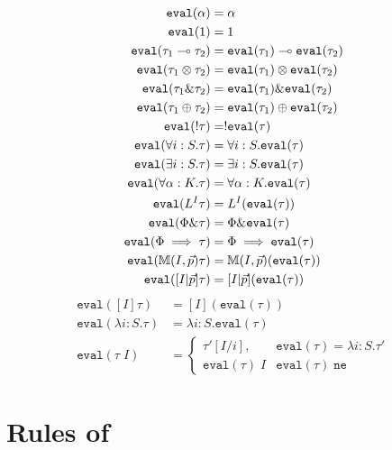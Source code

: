 \begin{align*}
\texttt{eval}(\alpha) &= \alpha\\
\texttt{eval}(1) &= 1\\
\texttt{eval}(\tau_1 \multimap \tau_2) &= \texttt{eval}(\tau_1) \multimap \texttt{eval}(\tau_2)\\
\texttt{eval}(\tau_1 \otimes \tau_2) &= \texttt{eval}(\tau_1) \otimes \texttt{eval}(\tau_2)\\
\texttt{eval}(\tau_1 \& \tau_2) &= \texttt{eval}(\tau_1) \& \texttt{eval}(\tau_2)\\
\texttt{eval}(\tau_1 \oplus \tau_2) &= \texttt{eval}(\tau_1) \oplus \texttt{eval}(\tau_2)\\
\texttt{eval}(!\tau) &= !\texttt{eval}(\tau)\\
\texttt{eval}(\forall i : S. \tau) &= \forall i : S. \texttt{eval}(\tau)\\
\texttt{eval}(\exists i : S. \tau) &= \exists i : S. \texttt{eval}(\tau)\\
\texttt{eval}(\forall \alpha : K. \tau) &= \forall \alpha : K. \texttt{eval}(\tau)\\
\texttt{eval}(L^I\tau) &= L^I(\texttt{eval}(\tau))\\
\texttt{eval}(\Phi \& \tau) &= \Phi \& \texttt{eval}(\tau)\\
\texttt{eval}(\Phi \implies \tau) &= \Phi \implies \texttt{eval}(\tau)\\
\texttt{eval}(\mathbb{M}(I,\vec{p})\tau) &= \mathbb{M}(I,\vec{p})(\texttt{eval}(\tau))\\
\texttt{eval}([I|\vec{p}]\tau) &= [I|\vec{p}](\texttt{eval}(\tau))
\end{align*}
\begin{align*}
\texttt{eval}([I]\tau) &= [I](\texttt{eval}(\tau))\\
\texttt{eval}(\lambda i : S. \tau) &= \lambda i : S. \texttt{eval}(\tau)\\
\texttt{eval}(\tau \; I) &= \begin{cases}
   \tau'[I/i], & \texttt{eval}(\tau) = \lambda i : S. \tau' \\
   \texttt{eval}(\tau) \; I & \texttt{eval}(\tau) \; \texttt{ne}
                              \end{cases}
\end{align*}
\newpage
\section{Rules of \bilambdaamor}

